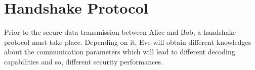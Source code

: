 \section{Handshake Protocol}
\label{sec:establishment}
Prior to the secure data transmission between Alice and Bob, a handshake protocol must take place. Depending on it, Eve will obtain different knowledges about the communication parameters which will lead to different decoding capabilities and so, different security performances. 